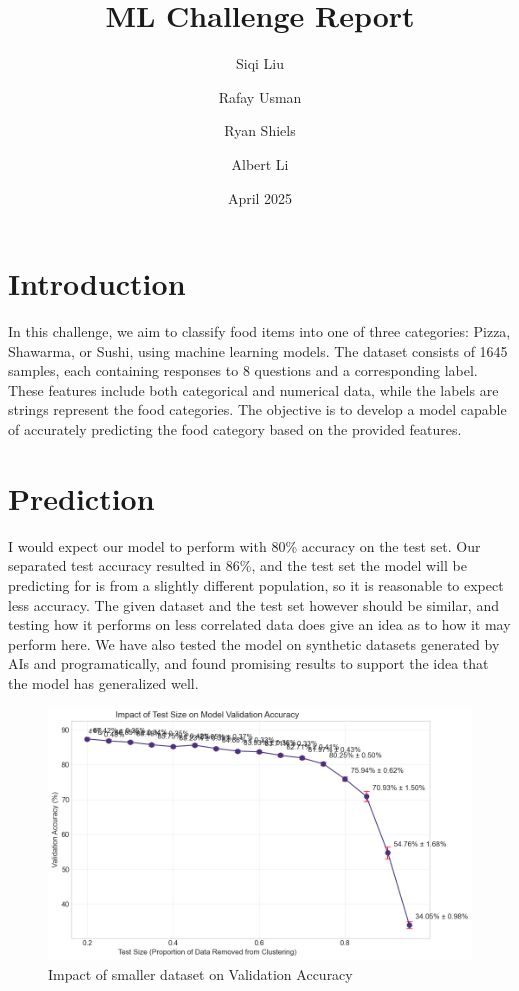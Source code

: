 \documentclass[journal]{IEEEtran}
\title{ML Challenge Report}
\author{
  Siqi Liu
  \and
  Rafay Usman
  \and
  Ryan Shiels
  \and
  Albert Li
}
\date{April 2025}
\begin{document}
\maketitle

\section{Introduction}
In this challenge, we aim to classify food items into one of three categories: Pizza, Shawarma, or Sushi, 
using machine learning models. The dataset consists of 1645 samples, each containing responses to 8 questions and a corresponding label. 
These features include both categorical and numerical data, while the labels are strings represent the food categories. 
The objective is to develop a model capable of accurately predicting the food category based on the provided features.







\section{Prediction}
I would expect our model to perform with 80\% accuracy on the test set. Our separated test accuracy resulted in 86\%, and the test set the model will be predicting for is from a slightly different population, so it is reasonable to expect less accuracy.
The given dataset and the test set however should be similar, and testing how it performs on less correlated data does give an idea as to how it may perform here. We have also tested the model on synthetic datasets generated by AIs and programatically, and found promising results to support the idea that the model has generalized well.
\begin{figure}[ht]
  \centerline{\includegraphics[width=\columnwidth]{TestSize.png}}
  \caption{Impact of smaller dataset on Validation Accuracy}
  \label{f:testsize_diagram}
\end{figure}
\end{document}
